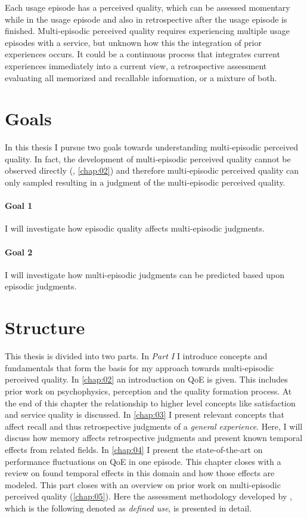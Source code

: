 Each usage episode has a perceived quality, which can be assessed momentary while in the usage episode and also in retrospective after the usage episode is finished.
Multi-episodic perceived quality requires experiencing multiple usage episodes with a service, but unknown how this the integration of prior experiences occurs.
It could be a continuous process that integrates current experiences immediately into a current view, a retrospective assessment evaluating all memorized and recallable information, or a mixture of both.

\section{Goals}
In this thesis I pursue two goals towards understanding multi-episodic perceived quality.
In fact, the development of multi-episodic perceived quality cannot be observed directly (\cf, \autoref{chap:02}) and therefore multi-episodic perceived quality can only sampled resulting in a judgment of the multi-episodic perceived quality.

\paragraph*{Goal 1}
I will investigate how episodic quality affects multi-episodic judgments.

\paragraph*{Goal 2}
I will investigate how multi-episodic judgments can be predicted based upon episodic judgments.

\section{Structure}
This thesis is divided into two parts.
In \emph{Part I} I introduce concepts and fundamentals that form the basis for my approach towards multi-episodic perceived quality.
In \autoref{chap:02} an introduction on \ac{QoE} is given.
This includes prior work on psychophysics, perception and the quality formation process.
At the end of this chapter the relationship to higher level concepts like satisfaction and service quality is discussed.
In \autoref{chap:03} I present relevant concepts that affect recall and thus retrospective judgments of a \emph{general experience}.
Here, I will discuss how memory affects retrospective judgments and present known temporal effects from related fields.
In \autoref{chap:04} I present the state-of-the-art on performance fluctuations on \ac{QoE} in one episode.
This chapter closes with a review on found temporal effects in this domain and how those effects are modeled.
This part closes with an overview on prior work on multi-episodic perceived quality (\autoref{chap:05}).
Here the assessment methodology developed by \cite{moller_single-call_2011}, which is the following denoted as \emph{defined use}, is presented in detail.

